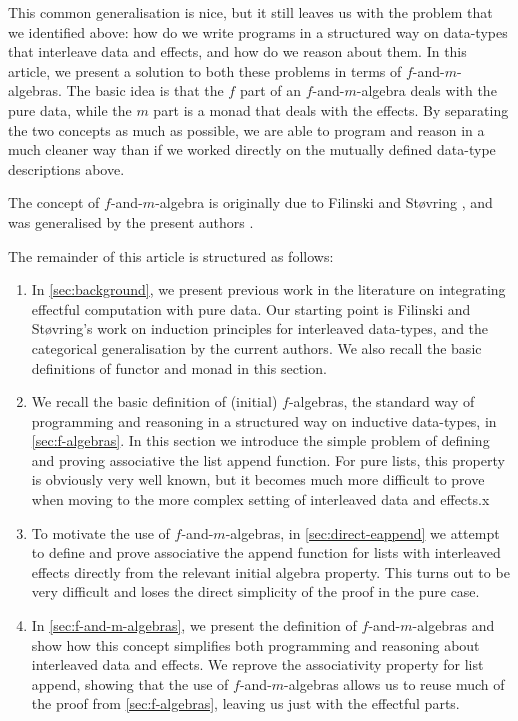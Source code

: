 \documentclass{jfp1}
\begin{document}
This common generalisation is nice, but it still leaves us with the
problem that we identified above: how do we write programs in a
structured way on data-types that interleave data and effects, and how
do we reason about them. In this article, we present a solution to
both these problems in terms of $f$-and-$m$-algebras. The basic idea
is that the $f$ part of an $f$-and-$m$-algebra deals with the pure
data, while the $m$ part is a monad that deals with the effects. By
separating the two concepts as much as possible, we are able to
program and reason in a much cleaner way than if we worked directly on
the mutually defined data-type descriptions above.

The concept of $f$-and-$m$-algebra is originally due to Filinski and
St\o{}vring \cite{filinski07inductive}, and was generalised by the
present authors \cite{atkey12fibrational}. 

The remainder of this article is structured as follows:

\begin{enumerate}
\item In \autoref{sec:background}, we present previous work in the
  literature on integrating effectful computation with pure data. Our
  starting point is Filinski and St\o{}vring's work on induction
  principles for interleaved data-types, and the categorical
  generalisation by the current authors. We also recall the basic
  definitions of functor and monad in this section.
\item We recall the basic definition of (initial) $f$-algebras, the standard way
  of programming and reasoning in a structured way on inductive
  data-types, in \autoref{sec:f-algebras}. In this section we introduce
  the simple problem of defining and proving associative the list
  append function. For pure lists, this property is obviously very
  well known, but it becomes much more difficult to prove when moving
  to the more complex setting of interleaved data and effects.x
\item To motivate the use of $f$-and-$m$-algebras, in
  \autoref{sec:direct-eappend} we attempt to define and prove
  associative the append function for lists with interleaved effects
  directly from the relevant initial algebra property. This turns out
  to be very difficult and loses the direct simplicity of the proof in
  the pure case.
\item In \autoref{sec:f-and-m-algebras}, we present the definition of
  $f$-and-$m$-algebras and show how this concept simplifies both
  programming and reasoning about interleaved data and effects. We
  reprove the associativity property for list append, showing that the
  use of $f$-and-$m$-algebras allows us to reuse much of the proof
  from \autoref{sec:f-algebras}, leaving us just with the effectful
  parts.
\end{enumerate}
\end{document}
